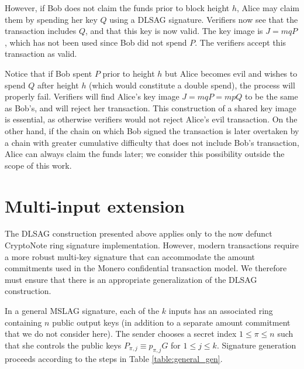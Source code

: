 \documentclass{mrl}
\begin{document}
However, if Bob does not claim the funds prior to block height $h$, Alice may claim them by spending her key $Q$ using a DLSAG signature. Verifiers now see that the transaction includes $Q$, and that this key is now valid. The key image is $J = mqP$, which has not been used since Bob did not spend $P$. The verifiers accept this transaction as valid.

Notice that if Bob spent $P$ prior to height $h$ but Alice becomes evil and wishes to spend $Q$ after height $h$ (which would constitute a double spend), the process will properly fail. Verifiers will find Alice's key image $J = mqP = mpQ$ to be the same as Bob's, and will reject her transaction. This construction of a shared key image is essential, as otherwise verifiers would not reject Alice's evil transaction. On the other hand, if the chain on which Bob signed the transaction is later overtaken by a chain with greater cumulative difficulty that does not include Bob's transaction, Alice can always claim the funds later; we consider this possibility outside the scope of this work.

\section{Multi-input extension}
The DLSAG construction presented above applies only to the now defunct CryptoNote ring signature implementation. However, modern transactions require a more robust multi-key signature that can accommodate the amount commitments used in the Monero confidential transaction model. We therefore must ensure that there is an appropriate generalization of the DLSAG construction.

In a general MSLAG signature, each of the $k$ inputs has an associated ring containing $n$ public output keys (in addition to a separate amount commitment that we do not consider here). The sender chooses a secret index $1 \leq \pi \leq n$ such that she controls the public keys $P_{\pi,j} \equiv p_{\pi,j}G$ for $1 \leq j \leq k$. Signature generation proceeds according to the steps in Table \ref{table:general_gen}.
\end{document}

